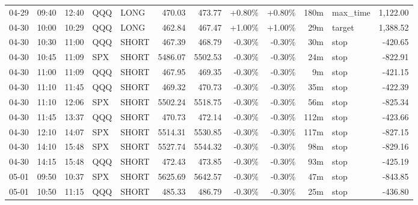 \documentclass[11pt,a4paper,twoside]{article}
\begin{document}
\begin{center}
\begin{longtable}{>{\color{txtmain}}l l l l l r r r r r >{\color{txtmain}}l r}
04-29 & 09:40 & 12:40 & QQQ & LONG & 470.03 & 473.77 & \textcolor{wingreen}{+0.80\%} & \textcolor{wingreen}{+0.80\%} & 180m & max\_time & \textcolor{wingreen}{1,122.00} \\
04-30 & 10:00 & 10:29 & QQQ & LONG & 462.84 & 467.47 & \textcolor{wingreen}{+1.00\%} & \textcolor{wingreen}{+1.00\%} & 29m & target & \textcolor{wingreen}{1,388.52} \\
04-30 & 10:30 & 11:00 & QQQ & SHORT & 467.39 & 468.79 & \textcolor{lossred}{-0.30\%} & \textcolor{lossred}{-0.30\%} & 30m & stop & \textcolor{lossred}{-420.65} \\
04-30 & 10:45 & 11:09 & SPX & SHORT & 5486.07 & 5502.53 & \textcolor{lossred}{-0.30\%} & \textcolor{lossred}{-0.30\%} & 24m & stop & \textcolor{lossred}{-822.91} \\
04-30 & 11:00 & 11:09 & QQQ & SHORT & 467.95 & 469.35 & \textcolor{lossred}{-0.30\%} & \textcolor{lossred}{-0.30\%} & 9m & stop & \textcolor{lossred}{-421.15} \\
04-30 & 11:10 & 11:45 & QQQ & SHORT & 469.32 & 470.73 & \textcolor{lossred}{-0.30\%} & \textcolor{lossred}{-0.30\%} & 35m & stop & \textcolor{lossred}{-422.39} \\
04-30 & 11:10 & 12:06 & SPX & SHORT & 5502.24 & 5518.75 & \textcolor{lossred}{-0.30\%} & \textcolor{lossred}{-0.30\%} & 56m & stop & \textcolor{lossred}{-825.34} \\
04-30 & 11:45 & 13:37 & QQQ & SHORT & 470.73 & 472.14 & \textcolor{lossred}{-0.30\%} & \textcolor{lossred}{-0.30\%} & 112m & stop & \textcolor{lossred}{-423.66} \\
04-30 & 12:10 & 14:07 & SPX & SHORT & 5514.31 & 5530.85 & \textcolor{lossred}{-0.30\%} & \textcolor{lossred}{-0.30\%} & 117m & stop & \textcolor{lossred}{-827.15} \\
04-30 & 14:10 & 15:48 & SPX & SHORT & 5527.74 & 5544.32 & \textcolor{lossred}{-0.30\%} & \textcolor{lossred}{-0.30\%} & 98m & stop & \textcolor{lossred}{-829.16} \\
04-30 & 14:15 & 15:48 & QQQ & SHORT & 472.43 & 473.85 & \textcolor{lossred}{-0.30\%} & \textcolor{lossred}{-0.30\%} & 93m & stop & \textcolor{lossred}{-425.19} \\
05-01 & 09:50 & 10:37 & SPX & SHORT & 5625.69 & 5642.57 & \textcolor{lossred}{-0.30\%} & \textcolor{lossred}{-0.30\%} & 47m & stop & \textcolor{lossred}{-843.85} \\
05-01 & 10:50 & 11:15 & QQQ & SHORT & 485.33 & 486.79 & \textcolor{lossred}{-0.30\%} & \textcolor{lossred}{-0.30\%} & 25m & stop & \textcolor{lossred}{-436.80} \\

\end{longtable}
\end{center}
\end{document}
